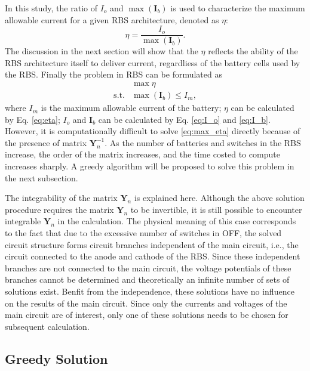 \documentclass{article}
\begin{document}
In this study, the ratio of $I_o$ and $\max (\bm{I}_b)$ is used to characterize the maximum allowable current for a given RBS architecture, denoted as $\eta$:
\begin{equation}\label{eq:eta}
    \eta = \frac{I_o}{\max (\bm{I}_b)}.
\end{equation}
The discussion in the next section will show that the $\eta$ reflects the ability of the RBS architecture itself to deliver current, regardliess of the battery cells used by the RBS.
Finally the problem in RBS can be formulated as
\begin{align}
    & \max \eta \label{eq:max_eta}\\
    \text{s.t.} & \max (\bm{I}_b) \leq I_m, \label{eq:Ib_leq_Im}
\end{align}
where $I_m$ is the maximum allowable current of the battery; $\eta$ can be calculated by Eq. \ref{eq:eta}; $I_o$ and $\bm{I}_b$ can be calculated by Eq. \ref{eq:I_o} and \ref{eq:I_b}.
However, it is computationally difficult to solve \ref{eq:max_eta} directly because of the presence of matrix $\bm{Y}_n^{-1}$.
As the number of batteries and switches in the RBS increase, the order of the matrix increases, and the time costed to compute increases sharply.
A greedy algorithm will be proposed to solve this problem in the next subsection.


The integrability of the matrix $\bm{Y}_n$ is explained here.
Although the above solution procedure requires the matrix $\bm{Y}_n$ to be invertible, it is still possible to encounter integrable $\bm{Y}_n$ in the calculation.
The physical meaning of this case corresponds to the fact that due to the excessive number of switches in OFF, the solved circuit structure forms circuit branches independent of the main circuit, i.e., the circuit connected to the anode and cathode of the RBS. 
Since these independent branches are not connected to the main circuit, the voltage potentials of these branches cannot be determined and theoretically an infinite number of sets of solutions exist. 
Benfit from the independence, these solutions have no influence on the results of the main circuit. 
Since only the currents and voltages of the main circuit are of interest, only one of these solutions needs to be chosen for subsequent calculation.

\subsection{Greedy Solution}\label{subsec:greedy_solution}
\end{document}
